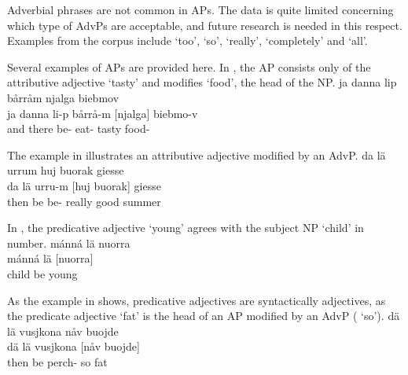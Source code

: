 Adverbial phrases are not common in APs. %
The data is quite limited concerning which type of AdvPs are acceptable, and future research is needed in this respect. Examples from the corpus include %
 ‘too’,  ‘so’,  ‘really’,  ‘completely’ and  ‘all’. 

Several examples of APs are provided here. In , the AP consists only of the attributive adjective  ‘tasty’ and modifies  ‘food’, the head of the NP. 
\ea\label{APstructureEx1}%
\glll	ja danna lip bårråm njalga biebmov\\
	ja danna li-p bårrå-m {[njalga]\subAP} biebmo-v\\
	and there be- eat- tasty food-\\\nopagebreak
{}	
\z

The example in  illustrates an attributive adjective modified by an AdvP. 
\ea\label{APstructureEx2}%
\glll	da lä urrum huj buorak giesse\\
	da lä urru-m [huj {buorak]\subAP} giesse\\
	then be\BS{} be- really good summer\BS{}\\\nopagebreak
{}	
\z

In , the predicative adjective  ‘young’ agrees with the subject NP  ‘child’ in number. 
\ea\label{APstructureEx3}%
\glll	mánná lä nuorra\\
	mánná lä {[nuorra]\subAP}\\
	child\BS{} be\BS{} young\BS{}\\\nopagebreak
{}	
\z

As the example in  shows, predicative adjectives are syntactically adjectives, as the predicate adjective  ‘fat’ is the head of an AP modified by an AdvP ( ‘so’). %
\ea\label{APstructureEx4}%
\glll	dä lä vusjkona nåv buojde\\
	dä lä vusjkona [nåv {buojde]\subAP}\\
	then be\BS{} perch- so fat\BS{}\\\nopagebreak
{}	
\z


